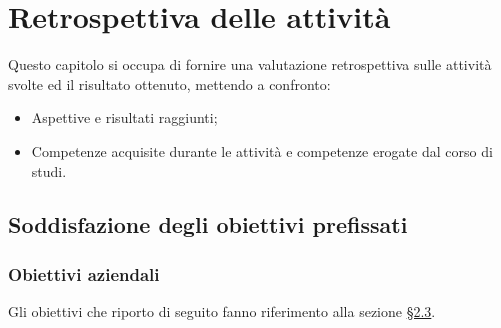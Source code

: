 \chapter{Retrospettiva delle attività}
\label{cap:resoconto}
Questo capitolo si occupa di fornire una valutazione retrospettiva sulle attività svolte ed il risultato ottenuto, mettendo a confronto:
\begin{itemize}
    \item Aspettive e risultati raggiunti;
    \item Competenze acquisite durante le attività e competenze erogate dal corso di studi.
\end{itemize}

\section{Soddisfazione degli obiettivi prefissati}

\subsection{Obiettivi aziendali}
Gli obiettivi che riporto di seguito fanno riferimento alla sezione \hyperref[sec:obiettivi-aziendali]{§2.3}.
